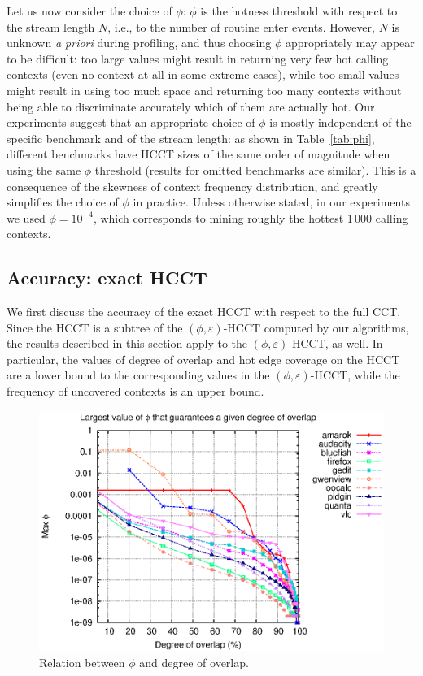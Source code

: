 \documentclass[preprint]{sigplanconf}
\begin{document}

Let us now consider the choice of $\phi$: $\phi$ is the hotness threshold with respect to the stream length $N$, i.e., to the number of routine enter events. However, $N$ is unknown {\em a priori} during profiling, and thus choosing $\phi$ appropriately may appear to be difficult: too large values might result in returning very few hot calling contexts (even no context at all in some extreme cases), while too small values might result in using too much space and returning too many contexts without being able to discriminate accurately which of them are actually hot. Our experiments suggest that an appropriate choice of $\phi$ is mostly independent of the specific benchmark and of the stream length: as shown in Table~\ref{tab:phi}, different benchmarks have HCCT sizes of the same order of magnitude when using the same $\phi$ threshold (results for omitted benchmarks are similar). This is a consequence of the skewness of context frequency distribution, and greatly simplifies the choice of $\phi$ in practice. Unless otherwise stated, in  our experiments we used $\phi=10^{-4}$, which corresponds to mining roughly the hottest 1\,000 calling contexts.

\subsection{Accuracy: exact HCCT}
\label{ss:accuracy-hcct}

We first discuss the accuracy of the exact HCCT with respect to the full CCT. Since the HCCT is a subtree of the $(\phi,\varepsilon)$-HCCT computed by our algorithms, the results described in this section apply to the $(\phi,\varepsilon)$-HCCT, as well. In particular, the values of degree of overlap and hot edge coverage on the HCCT are a lower bound to the corresponding values in the  $(\phi,\varepsilon)$-HCCT, while the frequency of uncovered contexts is an upper bound.

\begin{figure}[t]
\center\includegraphics[width=7.6 cm]{charts/maxphi.eps}
\caption{Relation between $\phi$ and degree of overlap.}
\label{fig:degreeOfOverlap}
\end{figure}
\end{document}
